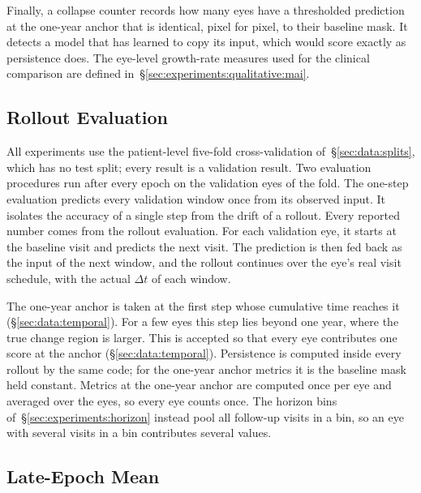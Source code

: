 Finally, a collapse counter records how many eyes have a thresholded
prediction at the one-year anchor that is identical, pixel for pixel, to their
baseline mask. It detects a model that has learned to copy its input,
which would score exactly as persistence does. The eye-level growth-rate
measures used for the clinical comparison are defined
in~\S\ref{sec:experiments:qualitative:mai}.

\subsection{Rollout Evaluation}
\label{sec:experiments:protocol:rollout}

All experiments
use the patient-level five-fold cross-validation of~\S\ref{sec:data:splits},
which has no test split; every result is a validation result.
Two evaluation procedures run after every epoch on the validation eyes of
the fold. The one-step evaluation predicts every validation window once
from its observed input. It isolates the accuracy of a single step from the
drift of a rollout. Every reported number comes from the rollout
evaluation. For each validation eye, it starts at the baseline
visit and predicts the next visit. The prediction is then fed back as the
input of the next window, and the rollout continues over the eye's real
visit schedule, with the actual $\Delta t$ of each window.

The one-year anchor is taken at the first step whose cumulative time
reaches it (\S\ref{sec:data:temporal}). For a few eyes this step lies
beyond one year, where the true change region is larger. This is accepted
so that every eye contributes one score at the anchor
(\S\ref{sec:data:temporal}). Persistence is computed inside every
rollout by the same code; for the one-year anchor metrics it is the baseline mask
held constant. Metrics at the one-year anchor are computed once per eye
and averaged over the eyes, so every eye counts once. The horizon bins
of~\S\ref{sec:experiments:horizon} instead pool all follow-up visits in a
bin, so an eye with several visits in a bin contributes several values.

\subsection{Late-Epoch Mean}
\label{sec:experiments:protocol:late}

